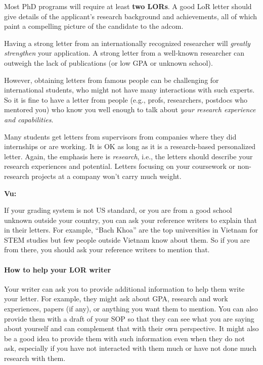 \documentclass[oneside,11pt,dvipsnames]{book}
\newenvironment{commentbox}[1][]{
  \small
  \begin{mybox}
    {\small \textbf{#1}}
  }{
  \end{mybox}
}
\begin{document}
Most PhD programs will require at least \textbf{two LORs}. A good LoR letter should give details of the applicant's research background and achievements, all of which paint a compelling picture of the candidate to the adcom.

Having a strong letter from an internationally recognized researcher will \emph{greatly strengthen} your application. A strong letter from a well-known researcher can outweigh the lack of publications (or low GPA or unknown school).

However, obtaining letters from famous people
can be challenging for international students, who might not have many interactions with such experts. So it is fine to have a letter from people (e.g., profs, researchers, postdocs who mentored you) who know you well enough to talk about \emph{your research experience and capabilities}. 

Many students get letters from supervisors from companies where they did internships or are working.  It is OK as long as it is a research-based personalized letter. Again, the emphasis here is \emph{research}, i.e., the letters should describe your research experiences and potential. Letters focusing on your coursework or non-research projects at a company won't carry much weight.

\begin{commentbox}[Vu:]
  If your grading system is not US standard, or you are from a good school unknown outside your country, you can ask your reference writers to explain that in their letters.  For example, ``Bach Khoa'' are the top universities in Vietnam for STEM studies but few people outside Vietnam know about them.  So if you are from there, you should ask your reference writers to mention that.
\end{commentbox}

\paragraph{How to help your LOR writer} Your writer can ask you to provide additional information to help them write your letter.  For example, they might ask about GPA, research and work experiences, papers (if any), or anything you want them to mention. You can also provide them with a draft of your SOP so that they can see what you are saying about yourself and can complement that with their own perspective.  It might also be a good idea to provide them with such information even when they do not ask, especially if you have not interacted with them much or have not done much research with them.
\end{document}
